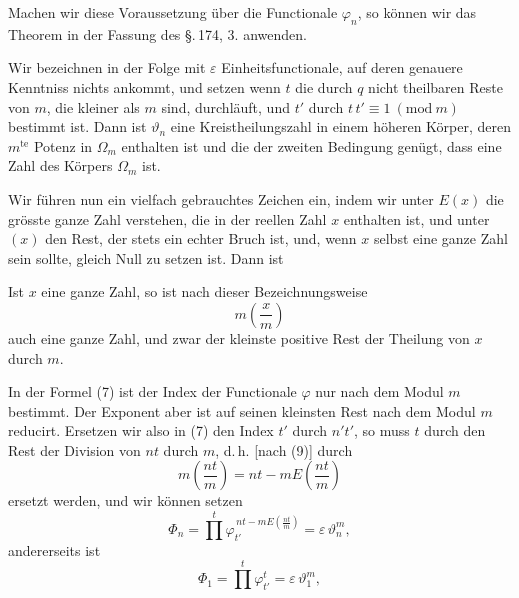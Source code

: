 Machen wir diese Voraussetzung über die Functionale $\varphi_n$, so
können wir das  Theorem in der Fassung des
\S.\,174, 3. anwenden.

Wir bezeichnen in der Folge mit $\varepsilon$ Einheitsfunctionale, auf
deren genauere Kenntniss nichts ankommt, und setzen
wenn $t$ die durch $q$ nicht theilbaren Reste von $m$, die kleiner
als $m$ sind, durchläuft, und $t'$ durch $t\,t' \equiv 1\ (\mathrm{mod}\ m)$ bestimmt
ist. Dann ist $\vartheta_n$ eine Kreistheilungszahl in einem höheren
Körper, deren $m^{\text{te}}$ Potenz in $\Omega_m$ enthalten ist und die der zweiten
Bedingung genügt, dass
eine Zahl des Körpers $\Omega_m$ ist.

Wir führen nun ein vielfach gebrauchtes Zeichen ein, indem
wir unter $E(x)$ die grösste ganze Zahl verstehen, die in der
reellen Zahl $x$ enthalten ist, und unter $(x)$ den Rest, der stets
ein echter Bruch ist, und, wenn $x$ selbst eine ganze Zahl sein
sollte, gleich Null zu setzen ist. Dann ist

Ist $x$ eine ganze Zahl, so ist nach dieser Bezeichnungsweise
\[
m \left(\frac{x}{m}\right)
\]
auch eine ganze Zahl, und zwar der kleinste positive Rest der
Theilung von $x$ durch $m$.

In der Formel (7) ist der Index der Functionale $\varphi$ nur
nach dem Modul $m$ bestimmt. Der Exponent aber ist auf seinen
kleinsten Rest nach dem Modul $m$ reducirt. Ersetzen wir also
in (7) den Index $t'$ durch $n' t'$, so muss $t$ durch den Rest der
Division von $n t$ durch $m$, d.\,h. [nach (9)] durch
\[
m \left(\frac{n t}{m}\right) = n t - m E\left(\frac{n t}{m}\right)
\]
ersetzt werden, und wir können setzen
\[
\Phi_n = \prod^{t} \varphi_{t'}^{\,n t - m E\left(\frac{n t}{m}\right)} = \varepsilon\, \vartheta_n^m,
\]
andererseits ist
\[
\Phi_1 = \prod^{t} \varphi_{t'}^{t} = \varepsilon\, \vartheta_1^m,
\]

